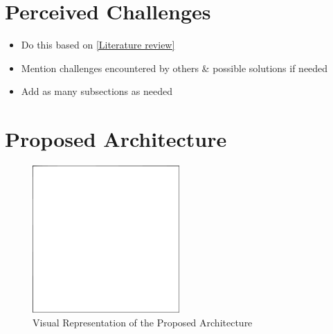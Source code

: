 \section{Perceived Challenges} \label{challenges}

\begin{itemize}
	\item{Do this based on \ref{Literature review}}
	\item{Mention challenges encountered by others & possible solutions if needed}
	\item{Add as many subsections as needed}
\end{itemize}

\section{Proposed Architecture} \label{arch}

\begin{figure}
\centering \includegraphics[width=0.5\textwidth]{kuvat/placeholder.png}
\caption{Visual Representation of the Proposed Architecture}
\label{Arch fig} 
\end{figure}
